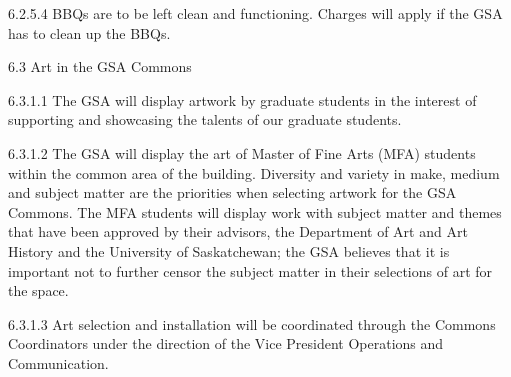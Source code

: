  6.2.5.4 BBQs are to be left clean and functioning. Charges will apply if the 
 GSA has to clean up the BBQs. 

 6.3 Art in the GSA Commons 
 
 6.3.1.1 The GSA will display artwork by graduate students in the interest of 
 supporting and showcasing the talents of our graduate students. 
 
 6.3.1.2 The GSA will display the art of Master of Fine Arts (MFA) students 
 within the common area of the building. Diversity and variety in 
 make, medium and subject matter are the priorities when selecting 
 artwork for the GSA Commons. The MFA students will display 
 work with subject matter and themes that have been approved by 
 their advisors, the Department of Art and Art History and the 
 University of Saskatchewan; the GSA believes that it is important 
 not to further censor the subject matter in their selections of art for 
 the space. 
 
 6.3.1.3 Art selection and installation will be coordinated through the 
 Commons Coordinators under the direction of the Vice President 
 Operations and Communication. 